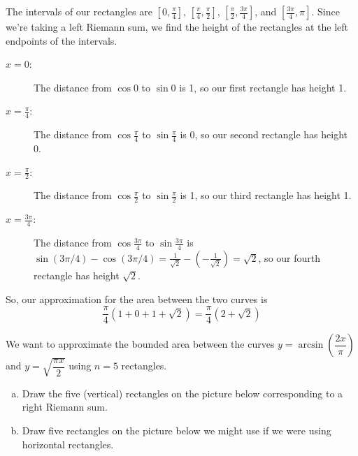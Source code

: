 \begin{solution}
\begin{center}
\end{center}
The intervals of our rectangles are $[0,\frac{\pi}{4}]$, $[\frac{\pi}{4},\frac{\pi}{2}]$,
$[\frac{\pi}{2},\frac{3\pi}{4}]$, and $[\frac{3\pi}{4},\pi]$. Since we're taking a left Riemann sum, we find the height of the rectangles at the left endpoints of the intervals.
\begin{description}
\item[$x = 0$:] The distance from $\cos 0$ to $\sin 0$ is 1, so our first rectangle has height 1.
\item[$x = \frac{\pi}{4}$:] The distance from $\cos \frac{\pi}{4}$ to $\sin \frac{\pi}{4}$ is 0, so our second rectangle has height 0.
\item[$x = \frac{\pi}{2}$:] The distance from $\cos \frac{\pi}{2}$ to $\sin \frac{\pi}{2}$ is 1, so our third rectangle has height 1.
\item[$x = \frac{3\pi}{4}$:] The distance from $\cos \frac{3\pi}{4}$ to $\sin \frac{3\pi}{4}$ is $\sin(3\pi/4)-\cos(3\pi/4) =\frac{1}{\sqrt{2}}-\left(-\frac{1}{\sqrt{2}}\right)=\sqrt{2} $, so our fourth rectangle has height $\sqrt{2}$.
\end{description}
So, our approximation for the area between the two curves is
\[\frac{\pi}{4}\left(1+0+1+\sqrt{2}\right)=\frac{\pi}{4}\left(2+\sqrt{2}\right)\]
\end{solution}
\begin{question}
We want to approximate the bounded area between the curves $y=\arcsin\left(\dfrac{2x}{\pi}\right)$ and $y=\sqrt{\dfrac{\pi x}{2}}$ using $n=5$ rectangles.
\begin{enumerate}[(a)]
\item Draw the five (vertical) rectangles on the picture below corresponding to a right Riemann sum.
\item Draw  five rectangles on the picture below we might use if we were using horizontal rectangles.
\end{enumerate}
\begin{center}
\end{center}
\end{question}
